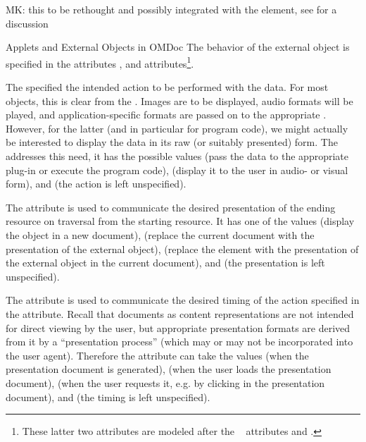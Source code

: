 \begin{module}[id=ext]
\begin{omgroup}[id=ext,short=Auxiliary Elements]
\begin{oldpart}{MK: this to be rethought and possibly integrated with the
    {} element, see  for a discussion}
\begin{omgroup}[id=applets]{Applets and External Objects in OMDoc}
The behavior of the external object is specified in the attributes
{}, {} and {}
attributes\footnote{These latter two attributes are modeled after the
  {\xlink}~\cite{DeRMal:xlink01} attributes {} and
  {}.}.
  
The {} specified the intended action to be performed with the
data. For most objects, this is clear from the {}. Images are to be
displayed, audio formats will be played, and application-specific formats are passed on to
the appropriate {}. However, for the latter (and in particular for
program code), we might actually be interested to display the data in its raw (or suitably
presented) form. The {} addresses this need, it has the possible
values {} (pass the data to the appropriate plug-in or
execute the program code), {} (display it to the user in
audio- or visual form), and {} (the action is left
unspecified).
  
The {} attribute is used to communicate the desired presentation of
the ending resource on traversal from the starting resource. It has one of the values
{} (display the object in a new document),
{} (replace the current document with the presentation of the
external object), {} (replace the {} element
with the presentation of the external object in the current document), and
{} (the presentation is left unspecified).
  
The {} attribute is used to communicate the desired timing of
the action specified in the {} attribute.  Recall that {\omdoc}
documents as content representations are not intended for direct viewing by the user, but
appropriate presentation formats are derived from it by a ``presentation process'' (which
may or may not be incorporated into the user agent). Therefore the
{} attribute can take the values
{} (when the presentation document is generated),
{} (when the user loads the presentation document),
{} (when the user requests it, e.g. by clicking in the
presentation document), and {} (the timing is left
unspecified).
  

\end{omgroup}
\end{oldpart}
\end{omgroup}
\end{module}
